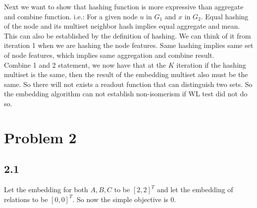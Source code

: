 \documentclass{book}
\begin{document}
Next we want to show that hashing function is more expressive than aggregate and combine function. i.e.: For a given node $u$ in $G_1$ and $x$ in $G_2$. Equal hashing of the node and its multiset neighbor hash implies equal aggregate and mean. This can also be established by the definition of hashing. We can think of it from iteration 1 when we are hashing the node features. Same hashing implies same set of node features, which implies same aggregation and combine result. \\

Combine 1 and 2 statement, we now have that at the $K$ iteration if the hashing multiset is the same, then the result of the embedding multiset also must be the same. So there will not exists a readout function that can distinguish two sets. So the embedding algorithm can not establish non-isomerism if WL test did not do so. 


\newpage 
\section*{Problem 2}
\subsection*{2.1}
Let the embedding for both $A, B, C$ to be $[2,2]^T$ and let the embedding of relations to be $[0,0]^T$. So now the simple objective is 0.
    
\end{document}
